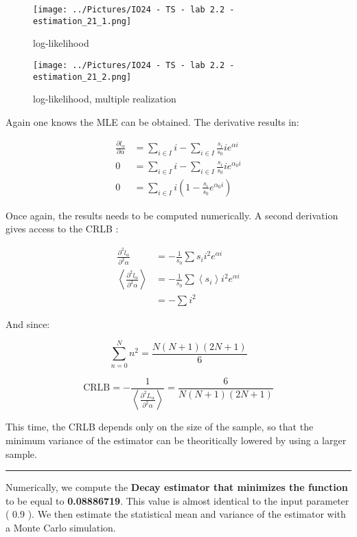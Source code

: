 \begin{figure}[h]
  \centering
  \texttt{[image: ../Pictures/IO24 - TS - lab 2.2 - estimation\_21\_1.png]}
  \caption{log-likelihood}
\end{figure}
  
\begin{figure}
  \centering
  \texttt{[image: ../Pictures/IO24 - TS - lab 2.2 - estimation\_21\_2.png]}
  \caption{log-likelihood, multiple realization}
\end{figure}

Again one knows the MLE can be obtained. The derivative results in:

\[
\begin{aligned}
\frac{\partial l_{\alpha}}{\partial \alpha} & = \sum_{i \in I} i - \sum_{i \in I} \frac{s_i}{s_0} i e^{\alpha i} \\
0 &= \sum_{i \in I} i - \sum_{i \in I} \frac{s_i}{s_0} i e^{\alpha_{0} i} \\
0 &= \sum_{i \in I} i \left( 1 - \frac{s_i}{s_0} e^{\alpha_{0} i}\right)
\end{aligned}
\]

Once again, the results needs to be computed numerically. A second derivation gives access to the CRLB :

\[
\begin{aligned}
\frac{\partial^2 l_{\alpha}}{\partial^2 \alpha} & = -\frac{1}{s_0} \sum s_i i^2 e^{\alpha i} \\
\left\langle \frac{\partial^2 l_{\alpha}}{\partial^2 \alpha}\right\rangle & = -\frac{1}{s_0} \sum \left\langle s_i \right\rangle i^2 e^{\alpha i} \\
& = -\sum i^2
\end{aligned}
\]

And since:

\[
\sum_{n=0}^{N} n^{2} = \frac{N(N+1)(2N+1)}{6}
\]

\[
\text{CRLB} = -\frac{1}{\left\langle \frac{\partial^2 L_{\alpha}}{\partial^2 \alpha}\right\rangle} = \frac{6}{N(N+1)(2N+1)}
\]

This time, the CRLB depends only on the size of the sample, so that the minimum variance of the estimator can be theoritically lowered by using a larger sample.

\begin{center}\rule{0.5\linewidth}{0.5pt}\end{center}

Numerically, we compute the \textbf{Decay estimator that minimizes the function} to be equal to \textbf{0.08886719}. This value is almost identical to the input parameter ( \(0.9 \) ). We then estimate the statistical mean and variance of the estimator with a Monte Carlo simulation.

